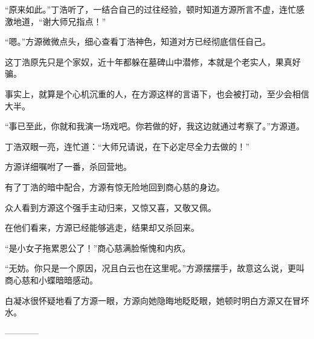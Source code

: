 \begin{this_body}
“原来如此。”丁浩听了，一结合自己的过往经验，顿时知道方源所言不虚，连忙感激地道，“谢大师兄指点！”

“嗯。”方源微微点头，细心查看丁浩神色，知道对方已经彻底信任自己。

这丁浩原先只是个家奴，近十年都躲在墓碑山中潜修，本就是个老实人，果真好骗。

事实上，就算是个心机沉重的人，在方源这样的言语下，也会被打动，至少会相信大半。

“事已至此，你就和我演一场戏吧。你若做的好，我这边就通过考察了。”方源道。

丁浩双眼一亮，连忙道：“大师兄请说，在下必定尽全力去做的！”

方源详细嘱咐了一番，杀回营地。

有了丁浩的暗中配合，方源有惊无险地回到商心慈的身边。

众人看到方源这个强手主动归来，又惊又喜，又敬又佩。

在他们看来，方源已经能够逃走，结果却又杀回来。

“是小女子拖累恩公了！”商心慈满脸惭愧和内疚。

“无妨。你只是一个原因，况且白云也在这里呢。”方源摆摆手，故意这么说，更叫商心慈和小蝶暗暗感动。

白凝冰很怀疑地看了方源一眼，方源向她隐晦地眨眨眼，她顿时明白方源又在冒坏水。

------------

\end{this_body}


